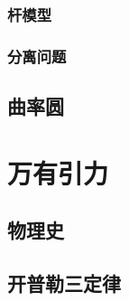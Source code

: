 \documentclass[cn,blue,11pt,normal]{elegantnote}
\begin{document}
\subsubsection{杆模型}
\begin{proset}
	
\end{proset}
\begin{proset}
	
\end{proset}
\begin{proset}
	
\end{proset}
\begin{proset}
	
\end{proset}
\subsubsection{分离问题}
\begin{proset}
	
\end{proset}

\subsection{曲率圆}
\begin{proset}
	
\end{proset}
\begin{proset}
	
\end{proset}


\newpage
\section{万有引力}
\subsection{物理史}
\begin{proset}
	
\end{proset}
\begin{proset}
	
\end{proset}
\subsection{开普勒三定律}
\begin{proset}
	
\end{proset}
\end{document}
